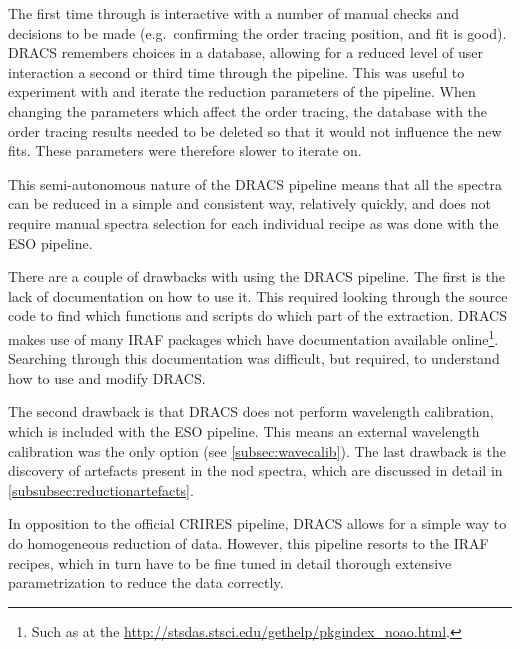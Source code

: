The first time through is interactive with a number of manual checks and decisions to be made (e.g.\ confirming the order tracing position, and fit is good).
{DRACS} remembers choices in a database, allowing for a reduced level of user interaction a second or third time through the pipeline.
This was useful to experiment with and iterate the reduction parameters of the pipeline.
When changing the parameters which affect the order tracing, the database with the order tracing results needed to be deleted so that it would not influence the new fits.
These parameters were therefore slower to iterate on.

This semi-autonomous nature of the {DRACS} pipeline means that all the spectra can be reduced in a simple and consistent way, relatively quickly, and does not require manual spectra selection for each individual recipe as was done with the {ESO} pipeline.

There are a couple of drawbacks with using the {DRACS} pipeline.
The first is the lack of documentation on how to use it.
This required looking through the source code to find which functions and scripts do which part of the extraction.
{DRACS} makes use of many {IRAF} packages which have documentation available online\footnote{Such as at the \href{Space Telescope Science Institute}{http://stsdas.stsci.edu/gethelp/pkgindex\_noao.html}.}.
Searching through this documentation was difficult, but required, to understand how to use and modify {DRACS}.

The second drawback is that {DRACS} does not perform wavelength calibration, which is included with the {ESO} pipeline.
This means an external wavelength calibration was the only option (see \cref{subsec:wavecalib}).
The last drawback is the discovery of artefacts present in the nod spectra, which are discussed in detail in \cref{subsubsec:reductionartefacts}.

In opposition to the official CRIRES pipeline, {DRACS} allows for a simple way to do homogeneous reduction of data.
However, this pipeline resorts to the {IRAF} recipes, which in turn have to be fine tuned in detail thorough extensive parametrization to reduce the data correctly.

